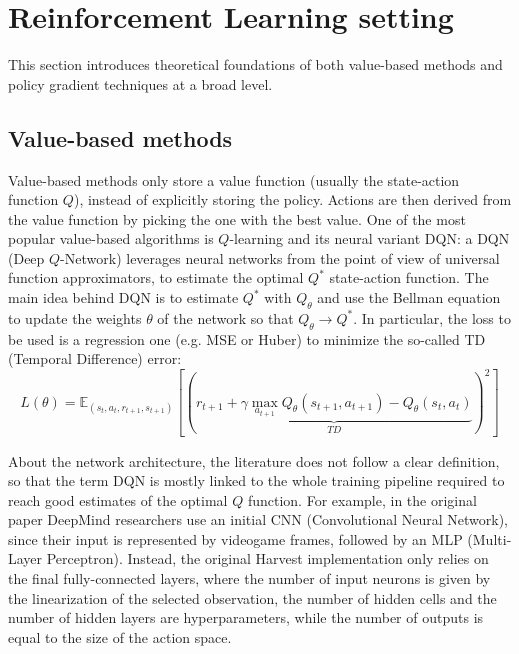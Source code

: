\documentclass{article}
\begin{document}
\newpage


\newpage
\appendix

\section{Reinforcement Learning setting}
\label{appendix:rl}
This section introduces theoretical foundations of both value-based methods and policy gradient techniques at a broad level.

\subsection{Value-based methods}
Value-based methods only store a value function (usually the state-action function $Q$), instead of explicitly storing the policy. Actions are then derived from the value function by picking the one with the best value. One of the most popular value-based algorithms is $Q$-learning and its neural variant DQN: a DQN (Deep $Q$-Network) \cite{dqn} leverages neural networks from the point of view of universal function approximators, to estimate the optimal $Q^*$ state-action function. The main idea behind DQN is to estimate $Q^*$ with $Q_\theta$ and use the Bellman equation to update the weights $\theta$ of the network so that $Q_\theta\rightarrow Q^*$. In particular, the loss to be used is a regression one (e.g. MSE or Huber) to minimize the so-called TD (Temporal Difference) error:
$$
L(\theta)=\mathbb{E}_{(s_t,a_t,r_{t+1},s_{t+1})}\left[\left(\underbrace{r_{t+1}+\gamma\max_{a_{t+1}}Q_\theta(s_{t+1}, a_{t+1}) - Q_\theta(s_t, a_t)}_{TD}\right)^2\right]
$$

About the network architecture, the literature does not follow a clear definition, so that the term DQN is mostly linked to the whole training pipeline required to reach good estimates of the optimal $Q$ function. For example, in the original paper \cite{dqn} DeepMind researchers use an initial CNN (Convolutional Neural Network), since their input is represented by videogame frames, followed by an MLP (Multi-Layer Perceptron). Instead, the original Harvest implementation \cite{harvest} only relies on the final fully-connected layers, where the number of input neurons is given by the linearization of the selected observation, the number of hidden cells and the number of hidden layers are hyperparameters, while the number of outputs is equal to the size of the action space. 
\end{document}
